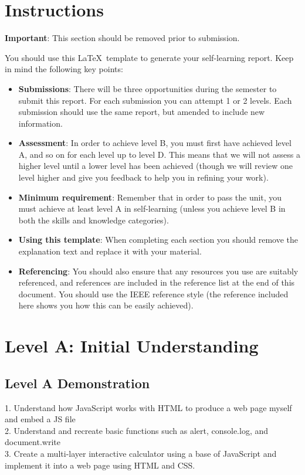 \documentclass[a4paper, 11pt]{report}
\begin{document}
\tableofcontents


\newpage
\section*{Instructions}

\textbf{Important}: This section should be removed prior to submission.

You should use this \LaTeX\ template to generate your self-learning report. Keep in mind the following key points:
\begin{itemize}
	\item \textbf{Submissions}: There will be three opportunities during the semester to submit this report. For each submission you can attempt 1 or 2 levels. Each submission should use the same report, but amended to include new information.
	\item \textbf{Assessment}: In order to achieve level B, you must first have achieved level A, and so on for each level up to level D. This means that we will not assess a higher level until a lower level has been achieved (though we will review one level higher and give you feedback to help you in refining your work).
	\item \textbf{Minimum requirement}: Remember that in order to pass the unit, you must achieve at least level A in self-learning (unless you achieve level B in both the skills and knowledge categories).
	\item \textbf{Using this template}: When completing each section you should remove the explanation text and replace it with your material.
	\item \textbf{Referencing}: You should also ensure that any resources you use are suitably referenced, and references are included in the reference list at the end of this document. You should use the IEEE reference style \cite{usyd2} (the reference included here shows you how this can be easily achieved).
\end{itemize}




\newpage
\section{Level A: Initial Understanding}
\vspace{5mm}
\subsection{Level A Demonstration}
1. Understand how JavaScript works with HTML to produce a web page myself and embed a JS file  \\ 2. Understand and recreate basic functions such as alert, console.log, and document.write \\ 3. Create a multi-layer interactive calculator using a base of JavaScript and implement it into a web page using HTML and CSS.
\end{document}

